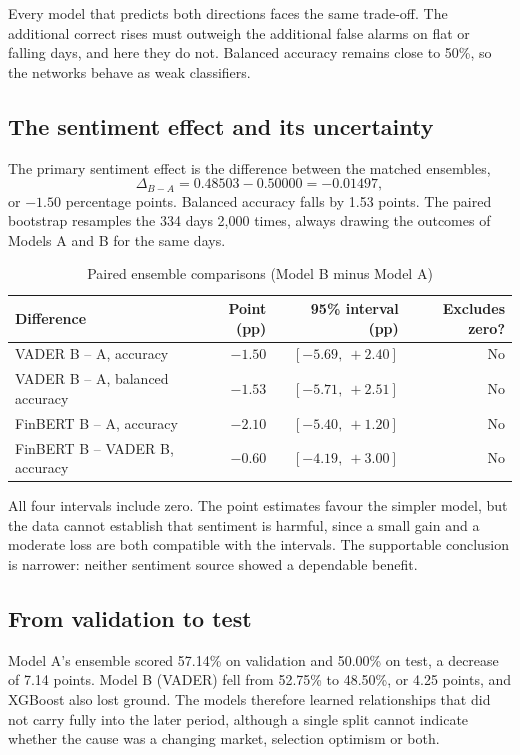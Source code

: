 Every model that predicts both directions faces the same trade-off. The additional correct rises must outweigh the additional false alarms on flat or falling days, and here they do not. Balanced accuracy remains close to 50\%, so the networks behave as weak classifiers.

\subsection{The sentiment effect and its uncertainty}
The primary sentiment effect is the difference between the matched ensembles,
\[
\Delta_{B-A}=0.48503-0.50000=-0.01497,
\]
or $-1.50$ percentage points. Balanced accuracy falls by 1.53 points. The paired bootstrap resamples the 334 days 2,000 times, always drawing the outcomes of Models A and B for the same days.

\begin{table}[htbp]\centering\small
\caption{Paired ensemble comparisons (Model B minus Model A)}\label{tab:delta}
\begin{tabularx}{\textwidth}{Xrrr}
\toprule
Difference & Point (pp) & 95\% interval (pp) & Excludes zero?\\\midrule
VADER B -- A, accuracy & $-1.50$ & $[-5.69,\ +2.40]$ & No\\
VADER B -- A, balanced accuracy & $-1.53$ & $[-5.71,\ +2.51]$ & No\\
FinBERT B -- A, accuracy & $-2.10$ & $[-5.40,\ +1.20]$ & No\\
FinBERT B -- VADER B, accuracy & $-0.60$ & $[-4.19,\ +3.00]$ & No\\
\bottomrule
\end{tabularx}
\end{table}

All four intervals include zero. The point estimates favour the simpler model, but the data cannot establish that sentiment is harmful, since a small gain and a moderate loss are both compatible with the intervals. The supportable conclusion is narrower: neither sentiment source showed a dependable benefit.

\subsection{From validation to test}
Model A's ensemble scored 57.14\% on validation and 50.00\% on test, a decrease of 7.14 points. Model B (VADER) fell from 52.75\% to 48.50\%, or 4.25 points, and XGBoost also lost ground. The models therefore learned relationships that did not carry fully into the later period, although a single split cannot indicate whether the cause was a changing market, selection optimism or both.

